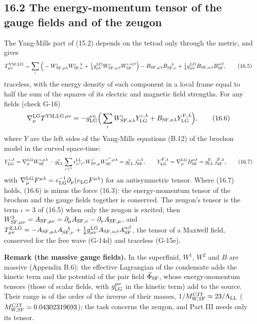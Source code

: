 \documentclass[
  10pt,
]{article}
\begin{document}
\hypertarget{the-energy-momentum-tensor-of-the-gauge-fields-and-of-the-zeugon}{%
\subsection{16.2 The energy-momentum tensor of the gauge fields and of
the
zeugon}\label{the-energy-momentum-tensor-of-the-gauge-fields-and-of-the-zeugon}}

The Yang-Mills part of (15.2) depends on the tetrad only through the
metric, and gives
\[T^{\rm YM,LG}_{\mu\nu}=\sum_\iota\Big(-W^\iota_{{\rm SF},\mu\lambda}W^{\iota\ \ \lambda}_{{\rm SF},\nu}+\tfrac14g^{\rm LG}_{\mu\nu}W^\iota_{{\rm SF},\alpha\beta}W^{\iota,\alpha\beta}_{\rm SF}\Big)-B_{{\rm SF},\mu\lambda}B^{\ \ \lambda}_{{\rm SF},\nu}+\tfrac14g^{\rm LG}_{\mu\nu}B_{{\rm SF},\alpha\beta}B^{\alpha\beta}_{\rm SF},\tag{16.5}\]
traceless, with the energy density of each component in a local frame
equal to half the sum of the squares of its electric and magnetic field
strengths. For any fields (check G-16)
\[\nabla^{\rm LG}_\mu T^{{\rm YM},{\rm LG}\,\mu\nu}=-g_{\rm LG}^{\nu\kappa}\Big(\sum_\iota W^\iota_{{\rm SF},\kappa\lambda}Y^{\iota,\lambda}_{\rm LG}+B_{{\rm SF},\kappa\lambda}Y^{{\rm F},\lambda}_{\rm LG}\Big),\tag{16.6}\]
where \(Y\) are the left sides of the Yang-Mills equations (B.12) of the
brochon model in the curved space-time:
\[Y^{\iota,\lambda}_{\rm LG}=\nabla^{\rm LG}_\mu W^{\iota,\mu\lambda}_{\rm SF}-g^{\rm v}_{\rm LL}\sum_{\iota'\iota''}\epsilon^{\rm LL}_{\iota\iota'\iota''}W^{\iota'}_{{\rm SF},\mu}W^{\iota'',\mu\lambda}_{\rm SF}=g^{\rm v}_{\rm LL}\,j^{\iota,\lambda}_{\rm SF},\qquad Y^{{\rm F},\lambda}_{\rm LG}=\nabla^{\rm LG}_\mu B^{\mu\lambda}_{\rm SF}=g^{\rm F}_{\rm LL}\,j^{{\rm F},\lambda}_{\rm SF},\tag{16.7}\]
with
\(\nabla^{\rm LG}_\mu F^{\mu\lambda}=e_{\rm LG}^{-1}\partial_\mu(e_{\rm LG}F^{\mu\lambda})\)
for an antisymmetric tensor. Where (16.7) holds, (16.6) is minus the
force (16.3): the energy-momentum tensor of the brochon and the gauge
fields together is conserved. The zeugon's tensor is the term
\(\iota=3\) of (16.5) when only the zeugon is excited; then
\(W^3_{{\rm SF},\mu\nu}=A_{{\rm SF},\mu\nu}=\partial_\mu A_{{\rm SF},\nu}-\partial_\nu A_{{\rm SF},\mu}\),
and
\(T^{\rm Z,LG}_{\mu\nu}=-A_{{\rm SF},\mu\lambda}A^{\ \ \lambda}_{{\rm SF},\nu}+\tfrac14g^{\rm LG}_{\mu\nu}A_{{\rm SF},\alpha\beta}A^{\alpha\beta}_{\rm SF}\),
the tensor of a Maxwell field, conserved for the free wave (G-14d) and
traceless (G-15e).

\textbf{Remark (the massive gauge fields).} In the superfluid, \(W^1\),
\(W^2\) and \(B\) are massive (Appendix B.6): the effective Lagrangian
of the condensate adds the kinetic term and the potential of the pair
field \(\vec\Phi_{\rm SF}\), whose energy-momentum tensors (those of
scalar fields, with \(g_{\rm LG}^{\mu\nu}\) in the kinetic term) add to
the source. Their range is of the order of the inverse of their masses,
\(1/M^{\rm CJT}_{W,{\rm SF}}\approx23/\Lambda_{\rm LL}\)
(\(M^{\rm CJT}_{W,{\rm SF}}=0.04302319693\)); the task concerns the
zeugon, and Part III needs only its tensor.
\end{document}
